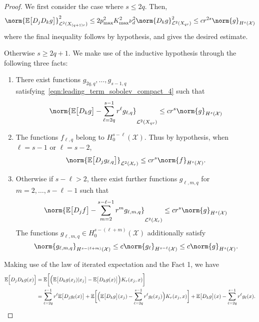 \documentclass{article}
\newcommand{\1}{\mathbf{1}}
\newcommand{\Xset}{\mathcal{X}}
\newcommand{\Leb}{\mathcal{L}}
\newcommand{\Ebb}{\mathbb{E}}
\theoremstyle{alden}
\theoremstyle{aldenthm}
\theoremstyle{definition}
\theoremstyle{remark}
\begin{document}
\begin{proof}
	We first consider the case where $s \leq 2q$. Then,
	\begin{align*}
	\norm{\Ebb\bigl[D_jD_kg\bigr]}_{\Leb^2(X_{(q + 1)r})}^2 \leq 2 p_{\max}^2 K_{\max}^2 \nu_d^2 \norm{D_kg}_{\Leb^2(X_{qr})}^2 \leq c r^{2s} \norm{g}_{H^s(\Xset)}
	\end{align*}
	where the final inequality follows by hypothesis, and gives the desired estimate.
	
	Otherwise $s \geq 2q + 1$. We make use of the inductive hypothesis through the following three facts:
	\begin{enumerate}
		\item There exist functions $g_{2q,q}, \ldots, g_{s - 1,q}$ satisfying~\eqref{eqn:leading_term_sobolev_compact_4} such that
		\begin{equation*}
		\norm{\Ebb\bigl[D_kg\bigr] - \sum_{\ell = 2q}^{s - 1}r^{\ell}g_{\ell,q}}_{\Leb^2(X_{qr})} \leq c r^s \norm{g}_{H^s(\Xset)}
		\end{equation*}
		\item The functions $f_{\ell,q}$ belong to $H_0^{s - \ell}(\Xset)$. Thus by hypothesis, when $\ell = s - 1$ or $\ell = s - 2$,
		\begin{equation*}
		\norm{\Ebb\bigl[D_jg_{\ell,q}\bigr]}_{\Leb^2(\Xset_r)} \leq c r^s \norm{f}_{H^s(\Xset)}.
		\end{equation*}
		\item Otherwise if $s - \ell > 2$, there exist further functions $g_{\ell,m,q}$ for $m = 2,\ldots,s - \ell - 1$ such that
		\begin{equation*}
		\norm{\Ebb\bigl[D_jf\bigr] - \sum_{m = 2}^{s - \ell - 1}r^{m}g_{\ell,m,q}}_{\Leb^2(\Xset_r)} \leq  c r^s \norm{g}_{H^s(\Xset)}
		\end{equation*}
		The functions $g_{\ell,m,q} \in H_0^{s - (\ell + m)}(\Xset)$ additionally satisfy
		\begin{equation*}
		\norm{g_{\ell,m,q}}_{H^{s - (\ell + m)}(\Xset)} \leq c \norm{g_{\ell}}_{H^{s - \ell}(\Xset)} \leq c \norm{g}_{H^s(\Xset)}.
		\end{equation*}
	\end{enumerate}
	Making use of the law of iterated expectation and the Fact 1, we have
	\begin{align}
	\Ebb\Bigl[D_jD_kg(x)\Bigr] & = \Ebb\biggl[\Bigl(\Ebb\bigl[D_kg(x_j)|x_j\bigr] - \Ebb\bigl[D_kg(x)\bigr]\Bigr)K_r(x_j,x)\biggr] \nonumber \\
	& = \sum_{\ell = 2q}^{s - 1} r^{\ell} \Ebb\bigl[D_jg_{\ell}(x)\bigr] + \Ebb\biggl[\Bigl(\Ebb\bigl[D_kg\bigr](x_j) - \sum_{\ell = 2q}^{s - 1}r^{\ell} g_{\ell}(x_j)\Bigr)K_r(x_j,x)\biggr] + \Ebb\bigl[D_kg\bigr](x) - \sum_{\ell = 2q}^{s - 1}r^{\ell} g_{\ell}(x). \label{eqn:leading_term_sobolev_compact_pf6}

\end{align}
\end{proof}
\end{document}

